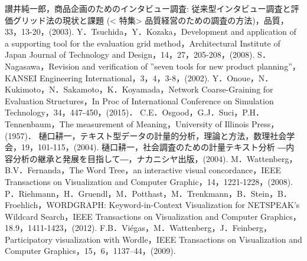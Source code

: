 \documentclass[syuuron]{kuee}
\begin{document}
\begin{thebibliography}{数字}
	 讃井純一郎，商品企画のためのインタビュー調査: 従来型インタビュー調査と評価グリッド法の現状と課題 (< 特集> 品質経営のための調査の方法)，品質，33，13-20，(2003).
	 Y．Tsuchida，Y．Kozaka，Development and application of a supporting tool for the evaluation grid method，Architectural Institute of Japan Journal of Technology and Design，14，27，205-208，(2008).
	 S．Nagasawa，Revision and verification of ”seven tools for new product planning”，KANSEI Engineering International，3，4，3-8，(2002).
	 Y．Onoue，N．Kukimoto，N．Sakamoto，K．Koyamada，Network Coarse-Graining for Evaluation Structures，In Proc of International Conference on Simulation Technology，34，447-450，(2015)．
	 C.E．Osgood，G.J．Suci，P.H．Tennenbaum，The measurement of Meaning，University of Illinois Press，(1957)．
	 樋口耕一，テキスト型データの計量的分析，理論と方法，数理社会学会，19，101-115，(2004).
	 樋口耕一，社会調査のための計量テキスト分析 ―内容分析の継承と発展を目指して―，ナカニシヤ出版，(2004).
	 M．Wattenberg，B.V．Fernanda，The Word Tree，an interactive visual concordance，IEEE Transactions on Visualization and Computer Graphic，14，1221-1228，(2008).
	 P．Riehmann，H．Gruendl，M．Potthast，M．Trenkmann，B．Stein，B．Froehlich，WORDGRAPH: Keyword-in-Context Visualization for NETSPEAK's Wildcard Search，IEEE Transactions on Visualization and Computer Graphics，18.9，1411-1423，(2012).
	 F.B．Viégas，M．Wattenberg，J．Feinberg，Participatory visualization with Wordle，IEEE Transactions on Visualization and Computer Graphics，15，6，1137–44，(2009).


\end{thebibliography}
\end{document}
